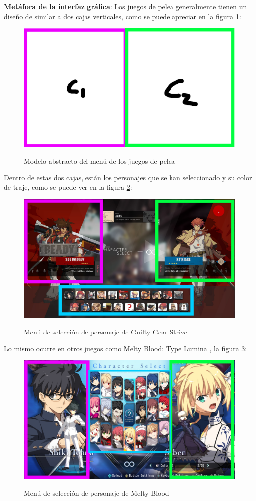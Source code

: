 \textbf{Metáfora de la interfaz gráfica}: Los juegos de pelea generalmente tienen un diseño de similar a dos cajas verticales, como se puede apreciar en la figura \ref{fig: abstract model}:

\begin{figure}[ht!]
    \centering
    \caption{Modelo abstracto del menú de los juegos de pelea}
    \includegraphics[height=0.2\textwidth]{figures/abstract-design.jpg}
    \label{fig: abstract model}
\end{figure}

Dentro de estas dos cajas, están los personajes que se han seleccionado y su color de traje, como se puede ver en la figura \ref{fig: strive chracter select}:

\begin{figure}[ht!]
    \centering
    \caption{Menú de selección de personaje de Guilty Gear Strive}
    \includegraphics[height=0.5\textwidth]{figures/guilty.jpg}
    \label{fig: strive chracter select}
\end{figure}

Lo mismo ocurre en otros juegos como Melty Blood: Type Lumina \cite{noauthor_melty_nodate}, la figura \ref{fig: melty character select}:

\begin{figure}[ht!]
    \centering
    \caption{Menú de selección de personaje de Melty Blood}
    \includegraphics[height=0.5\textwidth]{figures/melty.jpg}
    \label{fig: melty character select}
\end{figure}

